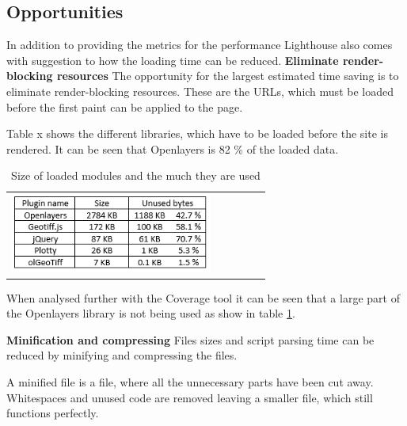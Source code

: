 
\subsection{Opportunities}
In addition to providing the metrics for the performance Lighthouse also comes with suggestion to how the loading time can be reduced. 
\textbf{Eliminate render-blocking resources}
The opportunity for the largest estimated time saving is to eliminate render-blocking resources. These are the URLs, which must be loaded before the first paint can be applied to the page. \citep{RenderBlocking}

Table x shows the different libraries, which have to be loaded before the site is rendered. It can be seen that Openlayers is 82 \% of the loaded data.

\begin{table}[htbp]
	\centering
	\begin{tabular}{l}
		\includegraphics[width=0.8\textwidth]{Pictures/tabPluginSize}
	\end{tabular}
	\caption{Size of loaded modules and the much they are used}
	\label{tabPluginSize}
\end{table}

When analysed further with the Coverage tool it can be seen that a large part of the Openlayers library is not being used as show in table \ref{tabPluginSize}.  


\textbf{Minification and compressing}
Files sizes and script parsing time can be reduced by minifying and compressing the files. 

A minified file is a file, where all the unnecessary parts have been cut away. Whitespaces and unused code are removed leaving a smaller file, which still functions perfectly. 

